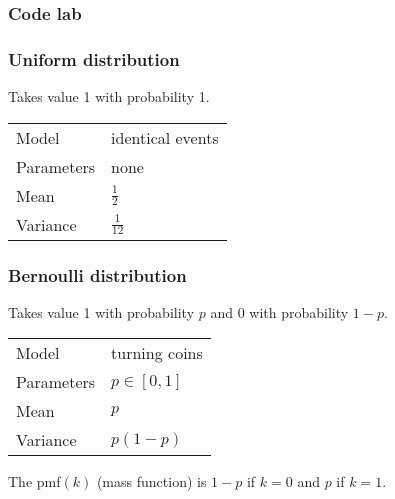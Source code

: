 \begin{frame}
\end{frame}

\begin{frame}
  \frametitle{Code lab}

\end{frame}

\begin{frame}
  \frametitle{Uniform distribution}

  Takes value 1 with probability 1.
  \bigskip

  \begin{tabular}{l|l}
    Model & identical events\\[1mm]
    Parameters & none\\[1mm]
    Mean & $\frac 12$\\[1mm]
    Variance & $\frac{1}{12}$
  \end{tabular}

  \vspace{6mm}
  

\end{frame}

\begin{frame}
  \frametitle{Bernoulli distribution}

  Takes value 1 with probability $p$ and 0 with probability $1-p$.
  \bigskip
  
  \begin{tabular}{l|l}
    Model & turning coins\\[1mm]
    Parameters & $p\in [0,1]$\\[1mm]
    Mean & $p$\\[1mm]
    Variance & $p(1-p)$
  \end{tabular}

  The pmf$(k)$ (mass function) is $1-p$ if $k=0$ and $p$ if $k=1$.
  
\end{frame}

